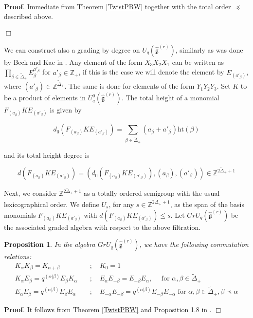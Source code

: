 \documentclass[12pt]{amsart}
\newtheorem{prop}[thm]{Proposition}
\numberwithin{equation}{section}
\newcommand{\dem }{\noindent\textbf{Proof}. }
\newcommand{\findem }{\hfill $\Box$ \vskip0.5cm }
\newcommand{\Z}{\ensuremath{\mathbb{Z}}}
\newcommand{\g}{\ensuremath{\mathfrak{g}}}
\begin{document}
\dem Immediate from Theorem \ref{TwistPBW} together with the total order $\preceq$ described above.

\findem


We can construct also a grading by degree on $U_q(\hat{\g}^{(r)})$, similarly as was done by Beck and Kac in \cite{BK}. Any element of the form $X_3X_2X_1$ can be written as $\prod_{\beta\in \tilde{\Delta}_{+}} E_{\beta}^{a'_\beta}$ for $a'_{\beta} \in \Z_{+}$, if this is the case we will denote the element by $E_{(a'_\beta)}$, where $(a'_\beta) \in \Z^{\tilde{\Delta}_{+}}$. The same is done for elements of the form $Y_1Y_2Y_3$. Set $K$ to be a product of elements in $U_q^0(\hat{\g}^{(r)})$. The total height of a monomial $F_{(a_\beta)}K E_{(a'_\beta)}$ is given by 

$$ d_0(F_{(a_\beta)}K E_{(a'_\beta)}) = \sum_{\beta \in \tilde{\Delta}_{+}} (a_\beta + a'_\beta) \mathrm{ht}(\beta)$$

and its total height degree is 

$$ d(F_{(a_\beta)}K E_{(a'_\beta)}) = (d_0(F_{(a_\beta)}K E_{(a'_\beta)}), (a_\beta), (a'_\beta)) \in \Z^{2\tilde{\Delta}_{+} + 1} $$

Next, we consider $\Z^{2\tilde{\Delta}_{+} + 1}$ as a totally ordered semigroup with the usual lexicographical order. We define $U_s$, for any $s\in \Z^{2\tilde{\Delta}_{+} + 1}$, as the span of the basis monomials $F_{(a_\beta)}KE_{(a'_{\beta})}$ with $d(F_{(a_\beta)}KE_{(a'_{\beta})}) \leq s$. Let $Gr U_q(\hat{\g}^{(r)})$ be the associated graded algebra with respect to the above filtration.

\begin{prop}\label{KacBeckCommRel} In the algebra $Gr U_q(\hat{\g}^{(r)})$, we have the following commutation relations:
    \begin{align*}
    K_{\alpha}K_\beta = K_{\alpha + \beta} & \quad; \quad K_0 = 1\\
    K_\alpha E_\beta  = q^{(\alpha | \beta)} E_\beta K_\alpha & \quad; \quad E_\alpha E_{-\beta} = E_{-\beta} E_\alpha, \quad \mbox{ for } \alpha,\beta \in \tilde{\Delta}_{+}\\
    E_{\alpha}E_{\beta} = q^{(\alpha | \beta)}E_{\beta}E_{\alpha} & \quad ; \quad E_{-\alpha}E_{-\beta} = q^{(\alpha | \beta)}E_{-\beta}E_{-\alpha} \mbox{ for } \alpha,\beta \in \tilde{\Delta}_{+}, \beta \prec \alpha
\end{align*}
\end{prop}

\dem It follows from Theorem \ref{TwistPBW} and Proposition 1.8 in \cite{BK}. \findem
\end{document}
